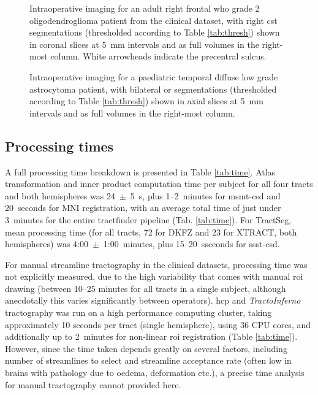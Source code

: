 \begin{figure}[htb!]
  \makebox[\linewidth][r]{%
  }
  \caption{Intraoperative imaging for an adult right frontal \gls{who} grade 2 oligodendroglioma patient from the clinical dataset, with right \gls{cst} segmentations (thresholded according to Table \ref{tab:thresh}) shown in coronal slices at 5~mm intervals and as full volumes in the right-most column. White arrowheads indicate the precentral sulcus.}
  \label{fig:lb.nh}
\end{figure}
\begin{figure}[htb!]
  \makebox[\linewidth][r]{%
  }
  \caption{Intraoperative imaging for a paediatric temporal diffuse low grade astrocytoma patient, with bilateral \gls{or} segmentations (thresholded according to Table \ref{tab:thresh}) shown in axial slices at 5~mm intervals and as full volumes in the right-most column.}
  \label{fig:lb.gosh}
\end{figure}


\subsection{Processing times}

A full processing time breakdown is presented in Table \ref{tab:time}.
Atlas transformation and inner product computation time per subject for all four tracts and both hemispheres was 24~$\pm$~5~s, plus 1--2~minutes for \gls{msmt}-\gls{csd} and 20~seconds for MNI registration, with an average total time of just under 3~minutes for the entire tractfinder pipeline (Tab. \ref{tab:time}).
For TractSeg, mean processing time (for all tracts, 72 for DKFZ and 23 for XTRACT, both hemispheres) was 4:00~$\pm$~1:00~minutes, plus 15--20~sseconds for \gls{ssst}-\gls{csd}.

For manual streamline tractography in the clinical datasets, processing time was not explicitly measured, due to the high variability that comes with manual \gls{roi} drawing (between 10--25 minutes for all tracts in a single subject, although anecdotally this varies significantly between operators).
\Gls{hcp} and \textit{TractoInferno} tractography was run on a high performance computing cluster, taking approximately 10 seconds per tract (single hemisphere), using 36 CPU cores, and additionally up to 2~minutes for non-linear \gls{roi} registration (Table \ref{tab:time}).
However, since the time taken depends greatly on several factors, including number of streamlines to select and streamline acceptance rate (often low in brains with pathology due to oedema, deformation etc.), a precise time analysis for manual tractography cannot provided here.

